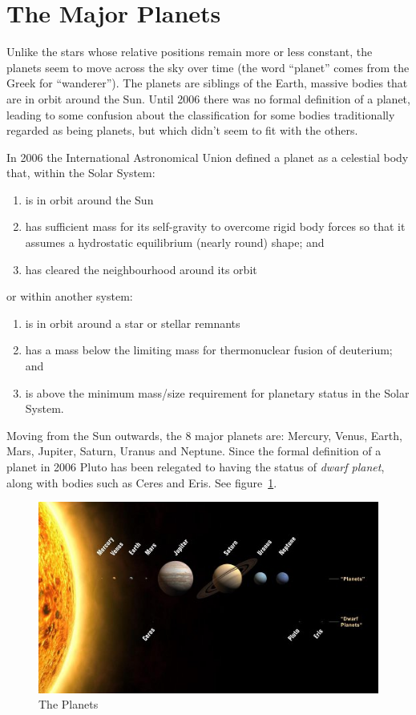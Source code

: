 \section{The Major Planets}
\label{sec:Planets}

Unlike the stars whose relative positions remain more or less constant,
the planets seem to move across the sky over time (the word ``planet''
comes from the Greek for ``wanderer''). The planets are siblings of the Earth,
massive bodies that are in orbit around the Sun. Until 2006 there was no
formal definition of a planet, leading to some confusion about the
classification for some bodies traditionally regarded as being planets, but
which didn't seem to fit with the others.

In 2006 the International Astronomical Union defined a planet as a
celestial body that, within the Solar System:

\begin{enumerate}
\item
  is in orbit around the Sun
\item
  has sufficient mass for its self-gravity to overcome rigid body forces
  so that it assumes a hydrostatic equilibrium (nearly round) shape; and
\item
  has cleared the neighbourhood around its orbit
\end{enumerate}

or within another system:

\begin{enumerate}
\item
  is in orbit around a star or stellar remnants
\item
  has a mass below the limiting mass for thermonuclear fusion of
  deuterium; and
\item
  is above the minimum mass/size requirement for planetary status in the
  Solar System.
\end{enumerate}

Moving from the Sun outwards, the 8 major planets are: Mercury, Venus,
Earth, Mars, Jupiter, Saturn, Uranus and Neptune. Since the formal
definition of a planet in 2006 Pluto has been relegated to having the
status of \emph{dwarf planet}, along with bodies such as Ceres and Eris.
See figure~\ref{fig:planets}.

\begin{figure}[t]
  \centering
  \includegraphics[width=0.9\linewidth]{pictures/the_planets.jpg}
  \caption{The Planets}
  \label{fig:planets}
\end{figure}


